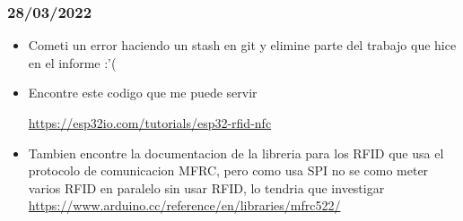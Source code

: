 \documentclass[../informe_krapp.tex]{subfiles}
\begin{document}
\subsubsection{28/03/2022}
\begin{itemize}
	\item Cometi un error haciendo un stash en git y elimine parte del trabajo que hice
	      en el informe :'(
	\item Encontre este codigo que me puede servir

	      \url{https://esp32io.com/tutorials/esp32-rfid-nfc}
	\item Tambien encontre la documentacion de la libreria para los RFID que usa el
	      protocolo de comunicacion MFRC, pero como usa SPI no se como meter varios RFID en
	      paralelo sin usar RFID, lo tendria que investigar
	      \url{https://www.arduino.cc/reference/en/libraries/mfrc522/}
\end{itemize}
\end{document}
